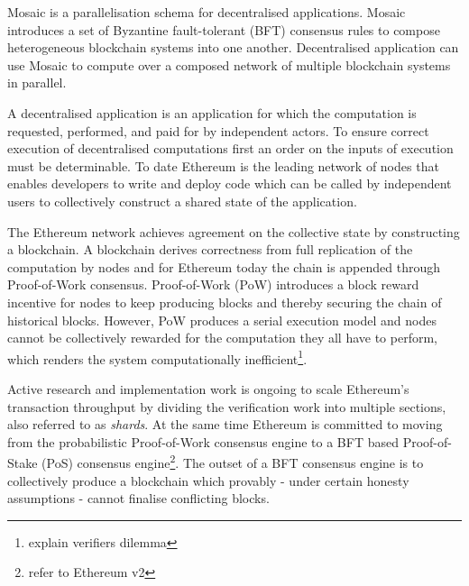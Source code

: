 \documentclass[12pt,a4paper]{article}
\begin{document}
Mosaic is a parallelisation schema for decentralised applications.  Mosaic introduces a set of Byzantine fault-tolerant (BFT) consensus rules to compose heterogeneous blockchain systems into one another. Decentralised application can use Mosaic to compute over a composed network of multiple blockchain systems in parallel. 

A decentralised application is an application for which the computation is requested, performed, and paid for by independent actors. To ensure correct execution of decentralised computations first an order on the inputs of execution must be determinable.  To date Ethereum is the leading network%
of nodes that enables developers to write and deploy code which can be called by independent users to collectively construct a shared state of the application.

The Ethereum network achieves agreement on the collective state by constructing a blockchain.  A blockchain derives correctness from full replication of the computation by nodes and for Ethereum today the chain is appended through Proof-of-Work consensus.%
Proof-of-Work (PoW) introduces a block reward incentive for nodes to keep producing blocks and thereby securing the chain of historical blocks.  However, PoW produces a serial execution model and nodes cannot be collectively rewarded for the computation they all have to perform, which renders the system computationally inefficient\footnote{explain verifiers dilemma}.

Active research and implementation work is ongoing to scale Ethereum's transaction throughput by dividing the verification work into multiple sections, also referred to as \emph{shards}. At the same time Ethereum is committed to moving from the probabilistic Proof-of-Work consensus engine to a BFT based Proof-of-Stake (PoS) consensus engine\footnote{refer to Ethereum v2}.  The outset of a BFT consensus engine is to collectively produce a blockchain which provably - under certain honesty assumptions - cannot finalise conflicting blocks.

\end{document}
